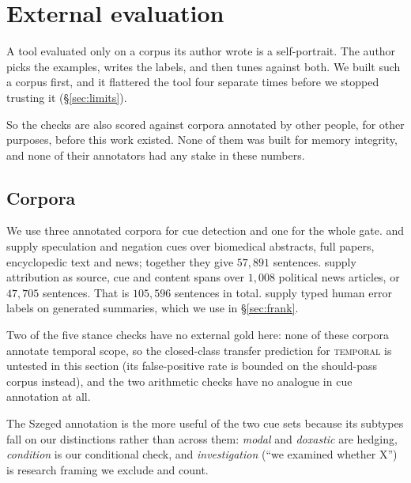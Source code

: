 \documentclass[11pt]{article}
\begin{document}
\section{External evaluation}
\label{sec:external}

A tool evaluated only on a corpus its author wrote is a self-portrait. The author picks the
examples, writes the labels, and then tunes against both. We built such a corpus first, and
it flattered the tool four separate times before we stopped trusting it
(\S\ref{sec:limits}).

So the checks are also scored against corpora annotated by other people, for other
purposes, before this work existed. None of them was built for memory integrity, and none
of their annotators had any stake in these numbers.

\subsection{Corpora}
We use three annotated corpora for cue detection and one for the whole gate.
\citet{vincze2008bioscope} and \citet{szarvas2012cross} supply speculation and negation
cues over biomedical abstracts, full papers, encyclopedic text and news; together they give
$57{,}891$ sentences. \citet{newell2018polnear} supply attribution as source, cue and
content spans over $1{,}008$ political news articles, or $47{,}705$ sentences. That is
$105{,}596$ sentences in total. \citet{pagnoni2021frank} supply typed human error labels on
generated summaries, which we use in \S\ref{sec:frank}.

Two of the five stance checks have no external gold here: none of these corpora annotate
temporal scope, so the closed-class transfer prediction for \textsc{temporal} is untested
in this section (its false-positive rate is bounded on the should-pass corpus instead),
and the two arithmetic checks have no analogue in cue annotation at all.

The Szeged annotation is the more useful of the two cue sets because its subtypes fall
on our distinctions rather than across them: \emph{modal} and \emph{doxastic} are
hedging, \emph{condition} is our conditional check, and \emph{investigation} (``we
examined whether X'') is research framing we exclude and count.
\end{document}
